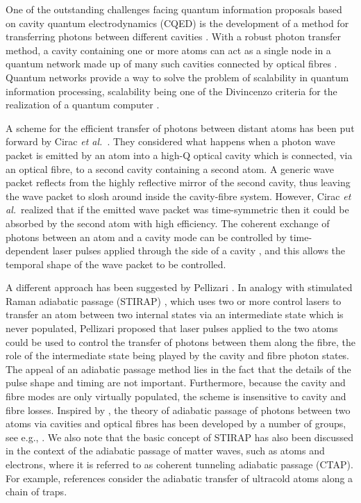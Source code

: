 \documentclass[twocolumn,english,pra,aps,superscriptaddress,floatfix]{revtex4-1}
\begin{document}
One of the outstanding challenges facing quantum information proposals based on cavity quantum electrodynamics (CQED) is the development of a method for transferring photons between different cavities \cite{roadmap}. With a robust photon transfer method, a cavity containing one or more atoms can act as a single node in a quantum network made up of many such cavities connected by optical fibres \cite{kimble}. Quantum networks provide a way to solve the problem of scalability in quantum information processing, scalability being one of the Divincenzo criteria for the realization of a quantum computer \cite{divincenzo00}.

A scheme for the efficient transfer of photons between distant atoms has been put forward by Cirac \textit{et al.}\ \cite{cirac97}. They considered what happens when a photon wave packet is emitted by an atom into a high-Q optical cavity which is connected, via an optical fibre, to a second cavity containing a second atom. A generic wave packet reflects from the highly reflective mirror of the second cavity, thus leaving the wave packet to slosh around inside the cavity-fibre system. However, Cirac \textit{et al.}\ realized that if the emitted wave packet was time-symmetric then it could be absorbed by the second atom with high efficiency. The coherent exchange of photons between an atom and a cavity mode can be controlled by time-dependent laser pulses applied through the side of a cavity \cite{boozer07}, and this allows the temporal shape of the wave packet to be controlled.  

A different approach has been suggested by Pellizari  \cite{pellizzari97,lo98}. In analogy with stimulated Raman adiabatic passage (STIRAP) \cite{bergmann98,vitanov01}, which uses two or more control lasers to transfer an atom between two internal states via an intermediate state which is never populated, Pellizari proposed that laser pulses applied to the two atoms could be used to control the transfer of photons between them along the fibre, the role of the intermediate state being played by the cavity and fibre photon states.  The appeal of an adiabatic passage method lies in the fact that the details of the pulse shape and timing are not important. Furthermore, because the cavity and fibre modes are only virtually populated, the scheme is insensitive to cavity and fibre losses.  Inspired by \cite{pellizzari97}, the theory of adiabatic passage of photons between two atoms via cavities and optical fibres has been developed by a number of groups, see e.g., \cite{enk99,serafini06,song07}.  We also note that the basic concept of STIRAP has also been discussed in the context of the adiabatic passage of matter waves, such as atoms and electrons, where it is referred to as coherent tunneling adiabatic passage (CTAP). For example, references  \cite{eckert04,rab08} consider the adiabatic transfer of ultracold atoms along a chain of traps. 
\end{document}
